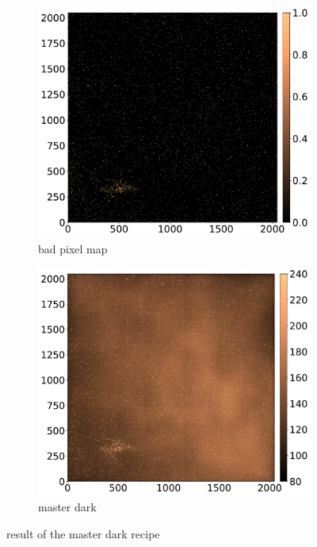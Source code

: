\documentclass[twoside,single]{lion-msc}
\begin{document}
\begin{figure}[!htbp]
\centering
\begin{subfigure}{.48\textwidth}
  \centering
  \includegraphics[width=1\linewidth]{badpixelmap}
  \caption{bad pixel map}
\end{subfigure}\hfill
\begin{subfigure}{.48\textwidth}
  \centering
  \includegraphics[width=1\linewidth]{dark}
  \caption{master dark}
\end{subfigure}
\caption{result of the master dark recipe}
\label{fig:masterdark}
\end{figure}
\end{document}
